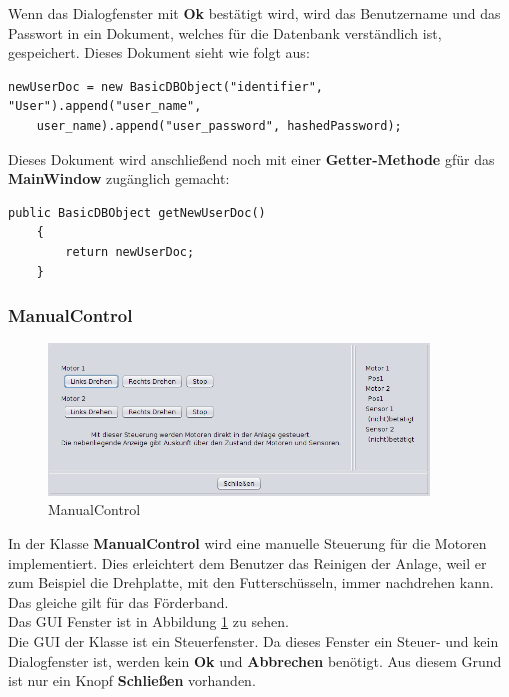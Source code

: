 \vspace{10pt}

Wenn das Dialogfenster mit \textbf{Ok} bestätigt wird, wird das Benutzername und das Passwort in ein Dokument, welches für die Datenbank verständlich ist, gespeichert. Dieses Dokument sieht wie folgt aus:
\begin{lstlisting}[style=Javastyle, caption=Benutzerdokument]
newUserDoc = new BasicDBObject("identifier", "User").append("user_name", 
	user_name).append("user_password", hashedPassword);
\end{lstlisting}

Dieses Dokument wird anschließend noch mit einer \textbf{Getter-Methode} gfür das  \textbf{MainWindow} zugänglich gemacht:
\begin{lstlisting}[style=Javastyle, caption=Benutzerdokument Getter-Methode]
	public BasicDBObject getNewUserDoc()
	{
		return newUserDoc;
	}
\end{lstlisting}

\subsubsection{ManualControl}
  \begin{figure}[H]
    \includegraphics[width=0.90\textwidth]{Bilder/GUI/ManualControl}
    \caption{ManualControl}
  \label{ManualControl}
  \end{figure}
In der Klasse \textbf{ManualControl} wird eine manuelle Steuerung für die Motoren implementiert. Dies erleichtert dem Benutzer das Reinigen der Anlage, weil er zum Beispiel die Drehplatte, mit den Futterschüsseln, immer nachdrehen kann. Das gleiche gilt für das Förderband.
\\ Das GUI Fenster ist in Abbildung \ref{ManualControl} zu sehen.
\\ Die GUI der Klasse ist ein Steuerfenster. Da dieses Fenster ein Steuer- und kein Dialogfenster ist, werden kein \textbf{Ok} und \textbf{Abbrechen} benötigt. Aus diesem Grund ist nur ein Knopf \textbf{Schließen} vorhanden.

